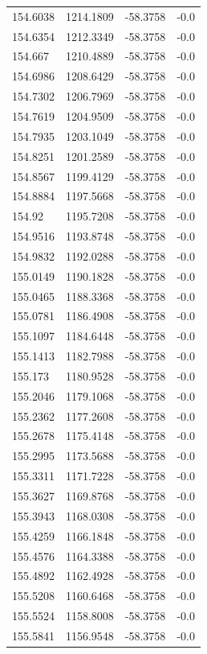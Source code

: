 \begin{table}[H]
\begin{tabular}{llll}
154.6038 & 1214.1809 & -58.3758 & -0.0 \\
154.6354 & 1212.3349 & -58.3758 & -0.0 \\
154.667 & 1210.4889 & -58.3758 & -0.0 \\
154.6986 & 1208.6429 & -58.3758 & -0.0 \\
154.7302 & 1206.7969 & -58.3758 & -0.0 \\
154.7619 & 1204.9509 & -58.3758 & -0.0 \\
154.7935 & 1203.1049 & -58.3758 & -0.0 \\
154.8251 & 1201.2589 & -58.3758 & -0.0 \\
154.8567 & 1199.4129 & -58.3758 & -0.0 \\
154.8884 & 1197.5668 & -58.3758 & -0.0 \\
154.92 & 1195.7208 & -58.3758 & -0.0 \\
154.9516 & 1193.8748 & -58.3758 & -0.0 \\
154.9832 & 1192.0288 & -58.3758 & -0.0 \\
155.0149 & 1190.1828 & -58.3758 & -0.0 \\
155.0465 & 1188.3368 & -58.3758 & -0.0 \\
155.0781 & 1186.4908 & -58.3758 & -0.0 \\
155.1097 & 1184.6448 & -58.3758 & -0.0 \\
155.1413 & 1182.7988 & -58.3758 & -0.0 \\
155.173 & 1180.9528 & -58.3758 & -0.0 \\
155.2046 & 1179.1068 & -58.3758 & -0.0 \\
155.2362 & 1177.2608 & -58.3758 & -0.0 \\
155.2678 & 1175.4148 & -58.3758 & -0.0 \\
155.2995 & 1173.5688 & -58.3758 & -0.0 \\
155.3311 & 1171.7228 & -58.3758 & -0.0 \\
155.3627 & 1169.8768 & -58.3758 & -0.0 \\
155.3943 & 1168.0308 & -58.3758 & -0.0 \\
155.4259 & 1166.1848 & -58.3758 & -0.0 \\
155.4576 & 1164.3388 & -58.3758 & -0.0 \\
155.4892 & 1162.4928 & -58.3758 & -0.0 \\
155.5208 & 1160.6468 & -58.3758 & -0.0 \\
155.5524 & 1158.8008 & -58.3758 & -0.0 \\
155.5841 & 1156.9548 & -58.3758 & -0.0 \\

\end{tabular}
\end{table}
